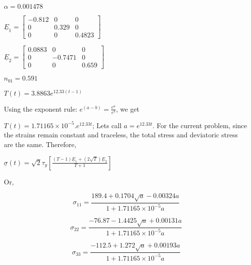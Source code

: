 \documentclass[10pt,letterpaper]{article}
\begin{document}
$\alpha=0.001478$

$\underline{E}_{1}=\left[\begin{array}{ccc}
-0.812 & 0 & 0\\
0 & 0.329 & 0\\
0 & 0 & 0.4823
\end{array}\right]$

$\underline{E}_{2}=\left[\begin{array}{ccc}
0.0883 & 0 & 0\\
0 & -0.7471 & 0\\
0 & 0 & 0.659
\end{array}\right]$

$n_{01}=0.591$

$T\left(t\right)=3.8863e^{12.33\left(t-1\right)}$

Using the exponent rule: $e^{\left(a-b\right)}=\frac{e^{a}}{e^{b}}$,
we get

$T\left(t\right)=1.71165\times10^{-5}.e^{12.33t}$; Lets call $a=e^{12.33t}$.
For the current problem, since the strains remain constant and traceless,
the total stress and deviatoric stress are the same. Therefore,

$\underline{\sigma}\left(t\right)=\sqrt{2}\tau_{y}\left[\frac{\left(T-1\right)\underline{E}_{1}+\left(2\sqrt{T}\right)\underline{E}_{2}}{T+1}\right]$

Or,

\[
\sigma_{11}=\frac{189.4+0.1704\sqrt{a}-0.00324a}{1+1.71165\times10^{-5}a}
\]


\[
\sigma_{22}=\frac{-76.87-1.4425\sqrt{a}+0.00131a}{1+1.71165\times10^{-5}a}
\]


\[
\sigma_{33}=\frac{-112.5+1.272\sqrt{a}+0.00193a}{1+1.71165\times10^{-5}a}
\]




\end{document}
